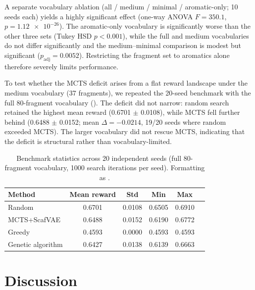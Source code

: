 \documentclass[10pt,a4paper]{article}
\begin{document}
A separate vocabulary ablation (all / medium / minimal / aromatic-only; \num{10} seeds each) yields a highly significant effect (one-way ANOVA $F=\num{350.1}$, $p=\num{1.12e-26}$). The aromatic-only vocabulary is significantly worse than the other three sets (Tukey HSD $p<\num{0.001}$), while the full and medium vocabularies do not differ significantly and the medium--minimal comparison is modest but significant ($p_{\mathrm{adj}}=\num{0.0052}$). Restricting the fragment set to aromatics alone therefore severely limits performance.

To test whether the MCTS deficit arises from a flat reward landscape under the medium vocabulary (\num{37} fragments), we repeated the \num{20}-seed benchmark with the full \num{80}-fragment vocabulary (). The deficit did not narrow: random search retained the highest mean reward (\num{0.6701} $\pm$ \num{0.0108}), while MCTS fell further behind (\num{0.6488} $\pm$ \num{0.0152}; mean $\Delta = \num{-0.0214}$, \num{19}/\num{20} seeds where random exceeded MCTS). The larger vocabulary did not rescue MCTS, indicating that the deficit is structural rather than vocabulary-limited.

\begin{table}[htbp]
  \centering
  \caption{Benchmark statistics across \num{20} independent seeds (full \num{80}-fragment vocabulary, \num{1000} search iterations per seed). Formatting as .}
  \label{tab:allfrag}
  \begin{tabular}{lccccc}
    \toprule
    Method & Mean reward & Std & Min & Max \\
    \midrule
    Random        & \num{0.6701} & \num{0.0108} & \num{0.6505} & \num{0.6910} \\
    MCTS+ScafVAE  & \num{0.6488} & \num{0.0152} & \num{0.6190} & \num{0.6772} \\
    Greedy        & \num{0.4593} & \num{0.0000} & \num{0.4593} & \num{0.4593} \\
    Genetic algorithm & \num{0.6427} & \num{0.0138} & \num{0.6139} & \num{0.6663} \\
    \bottomrule
  \end{tabular}
\end{table}

\section{Discussion}
\end{document}
